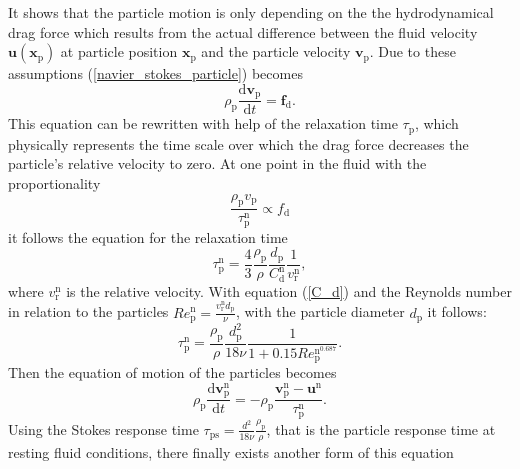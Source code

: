 \documentclass[11pt,a4paper,openany,oneside,parskip=half*]{article}
\renewcommand*\vec[1]{\boldsymbol{#1}}
\begin{document}
It shows that the particle motion is only depending on the the hydrodynamical drag force which results from the actual difference between the fluid velocity $\vec{u}(\vec{x}_\mathrm{p})$ at particle position $\vec{x}_\mathrm{p}$ and the particle velocity $\vec{v}_\mathrm{p}$.
Due to these assumptions (\ref{navier_stokes_particle}) becomes
\begin{equation}
\rho_\mathrm{p}\frac{\mathrm{d}\vec{v}_\mathrm{p}}{\mathrm{d}t} = \vec{f}_\mathrm{d}.
\end{equation}
This equation can be rewritten with help of the relaxation time $\tau_\mathrm{p}$, which physically represents the time scale over which the drag force decreases the particle's relative velocity to zero. At one point in the fluid with the proportionality 
\begin{equation}
\frac{\rho_\mathrm{p} v_\mathrm{p}}{\tau_\mathrm{p}^\mathrm{n}} \propto f_\mathrm{d}
\end{equation} 
it follows the equation for the relaxation time
\begin{equation}
\tau_\mathrm{p}^\mathrm{n} = \frac{4}{3}\frac{\rho_\mathrm{p}}{\rho} \frac{d_\mathrm{p}}{C_\mathrm{d}^\mathrm{n}}\frac{1}{v_\mathrm{r}^\mathrm{n}},
\end{equation}
where $v_\mathrm{r}^\mathrm{n}$ is the relative velocity. 
With equation (\ref{C_d}) and the Reynolds number in relation to the particles $Re_\mathrm{p}^\mathrm{n}=\frac{v_\mathrm{r}^\mathrm{n}d_\mathrm{p}}{\nu}$, with the particle diameter $d_\mathrm{p}$ it follows:
\begin{equation}
\tau_\mathrm{p}^\mathrm{n} = \frac{\rho_\mathrm{p}}{\rho}\frac{d_\mathrm{p}^2}{18\nu}\frac{1}{1+0.15Re_\mathrm{p}^\mathrm{n^\mathrm{0.687}}}.
\end{equation} 
Then the equation of motion of the particles becomes
\begin{equation}
\rho_\mathrm{p}\frac{\mathrm{d}\vec{v}_\mathrm{p}^\mathrm{n}}{\mathrm{d}t} = -\rho_\mathrm{p}\frac{\vec{v}_\mathrm{p}^\mathrm{n}-\vec{u}^\mathrm{n}}{\tau_\mathrm{p}^\mathrm{n}}.
\end{equation}
Using the Stokes response time $\tau_\mathrm{ps} =\frac{d^2}{18 \nu} \frac{\rho_\mathrm{p}}{\rho}$, that is the particle response time at resting fluid conditions, there finally exists another form of this equation 
\nomenclature[rxp]{$\vec{x}_\mathrm{p}$}{Particle position vector}
\end{document}

